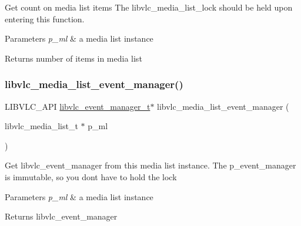 Get count on media list items The libvlc\+\_\+media\+\_\+list\+\_\+lock should be held upon entering this function.


\begin{DoxyParams}{Parameters}
{\em p\+\_\+ml} & a media list instance \\
\hline
\end{DoxyParams}
\begin{DoxyReturn}{Returns}
number of items in media list 
\end{DoxyReturn}
\mbox{\label{group__libvlc__media__list_gae2623249eb6571b5b007ddc74497bba6}} 
\subsubsection{\texorpdfstring{libvlc\+\_\+media\+\_\+list\+\_\+event\+\_\+manager()}{libvlc\_media\_list\_event\_manager()}}
{\footnotesize\ttfamily L\+I\+B\+V\+L\+C\+\_\+\+A\+PI \hyperlink{group__libvlc__event_gaa82f247503d3558b9117550e8d3c9259}{libvlc\+\_\+event\+\_\+manager\+\_\+t}$\ast$ libvlc\+\_\+media\+\_\+list\+\_\+event\+\_\+manager (\begin{DoxyParamCaption}\item[{libvlc\+\_\+media\+\_\+list\+\_\+t $\ast$}]{p\+\_\+ml }\end{DoxyParamCaption})}

Get libvlc\+\_\+event\+\_\+manager from this media list instance. The p\+\_\+event\+\_\+manager is immutable, so you don\textquotesingle{}t have to hold the lock


\begin{DoxyParams}{Parameters}
{\em p\+\_\+ml} & a media list instance \\
\hline
\end{DoxyParams}
\begin{DoxyReturn}{Returns}
libvlc\+\_\+event\+\_\+manager 
\end{DoxyReturn}
\mbox{\label{group__libvlc__media__list_ga7ba4219836788ca58127199da06a6550}} 
